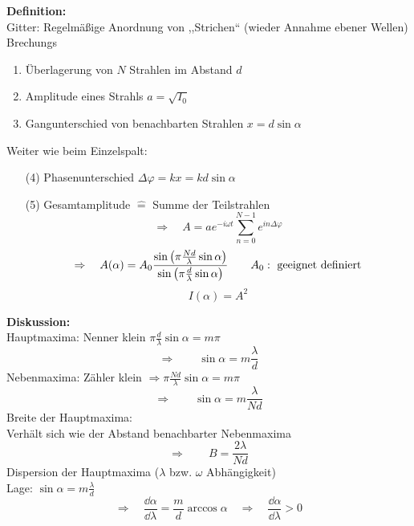 \textbf{Definition:}\\
Gitter: Regelmäßige Anordnung von ,,Strichen``
 (wieder Annahme ebener Wellen)\\
Brechungs
\begin{enumerate}[(1)]
	\item Überlagerung von $ N $ Strahlen im Abstand $ d $
	\item Amplitude eines Strahls $ a = \sqrt{I_0} $
	\item Gangunterschied von benachbarten Strahlen $ x = d \sin \alpha $
\end{enumerate}	
Weiter wie beim Einzelspalt:
\begin{enumerate}[(4)]
	\item[(4)] Phasenunterschied $ \Delta \varphi = k x = k d \sin \alpha $
	\item[(5)] Gesamtamplitude $ \widehat{=} $ Summe der Teilstrahlen
	\begin{equation*}
	\Rightarrow \quad A = a e^{-i \omega t} \sum_{n=0}^{N-1} e^{i n \Delta \varphi}
	\end{equation*}
	\begin{equation*}
	\Rightarrow \quad A(\alpha) = A_0 \frac{\sin \left(\pi \frac{N d}{\lambda} \sin \alpha \right)}{\sin \left( \pi \frac{d}{\lambda} \sin \alpha \right)} \qquad A_0: \textrm{ geeignet definiert}
	\end{equation*}
	\begin{equation*}
	I(\alpha) = A^2
	\end{equation*}
\end{enumerate}
\textbf{Diskussion:}\\[5pt]
Hauptmaxima: Nenner klein $ \pi \frac{d}{\lambda} \sin \alpha = m \pi $
\begin{equation*}
\Rightarrow \qquad \sin \alpha = m \frac{\lambda}{d}
\end{equation*}
Nebenmaxima: Zähler klein $ \Rightarrow \pi \frac{N d}{\lambda} \sin \alpha = m \pi $
\begin{equation*}
\Rightarrow \qquad \sin \alpha = m \frac{\lambda}{N d}
\end{equation*}
Breite der Hauptmaxima:\\
Verhält sich wie der Abstand benachbarter Nebenmaxima
\begin{equation*}
\Rightarrow \qquad B = \frac{2 \lambda}{N d}
\end{equation*}
Dispersion der Hauptmaxima ($ \lambda $ bzw. $ \omega $ Abhängigkeit)\\
Lage: $ \sin \alpha = m \frac{\lambda}{d} $
\begin{equation*}
\Rightarrow \quad \frac{\dd \alpha}{\dd \lambda} = \frac{m}{d} \arccos \alpha \quad \Rightarrow \quad \frac{\dd \alpha}{\dd \lambda} > 0
\end{equation*}

